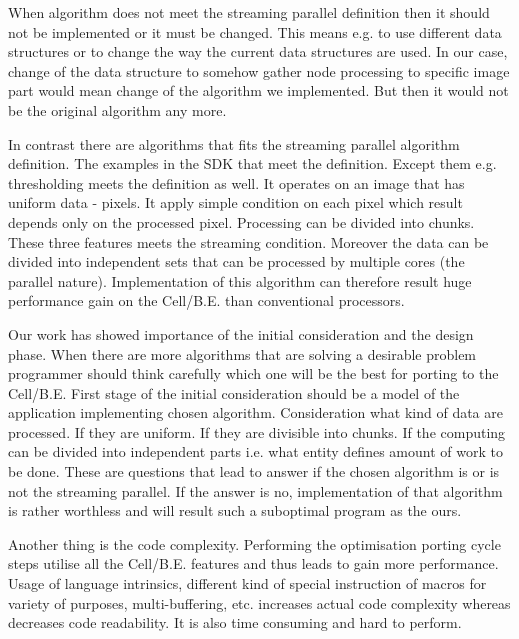\par
When algorithm does not meet the streaming parallel definition then it should not be implemented or it must be changed.
This means e.g. to use different data structures or to change the way the current data structures are used.
In our case, change of the data structure to somehow gather node processing to specific image part would mean change of the algorithm we implemented.
But then it would not be the original algorithm any more.

\par
In contrast there are algorithms that fits the streaming parallel algorithm definition.
The examples in the SDK that meet the definition.
Except them e.g. thresholding meets the definition as well.
It operates on an image that has uniform data - pixels.
It apply simple condition on each pixel which result depends only on the processed pixel.
Processing can be divided into chunks.
These three features meets the streaming condition.
Moreover the data can be divided into independent sets that can be processed by multiple cores (the parallel nature).
Implementation of this algorithm can therefore result huge performance gain on the \mbox{Cell/B.E.} than conventional processors.

\par
Our work has showed importance of the initial consideration and the design phase.
When there are more algorithms that are solving a desirable problem programmer should think carefully which one will be the best for porting to the \mbox{Cell/B.E.}
First stage of the initial consideration should be a model of the application implementing chosen algorithm.
Consideration what kind of data are processed.
If they are uniform.
If they are divisible into chunks.
If the computing can be divided into independent parts i.e. what entity defines amount of work to be done.
These are questions that lead to answer if the chosen algorithm is or is not the streaming parallel.
If the answer is no, implementation of that algorithm is rather worthless and will result such a suboptimal program as the ours.

\par
Another thing is the code complexity.
Performing the optimisation porting cycle steps utilise all the \mbox{Cell/B.E.} features and thus leads to gain more performance.
Usage of language intrinsics, different kind of special instruction of macros for variety of purposes, multi-buffering, etc. increases actual code complexity whereas decreases code readability.
It is also time consuming and hard to perform.

